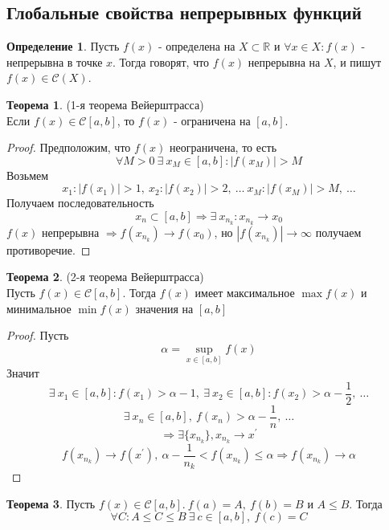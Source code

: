 \documentclass[a4paper, 12pt]{article}
\newcommand{\R}{\mathbb{R}}
\theoremstyle{definition}
\newtheorem*{definition}{Определение}
\newtheorem*{theorem}{Теорема}
\begin{document}
    \subsection{Глобальные свойства непрерывных функций}
        \begin{definition}
            Пусть $f(x)$ - определена на $X\subset \R$ и $\forall x\in X: f(x)$ - непрерывна в точке $x$. Тогда говорят, что $f(x)$ непрерывна на $X$, и пишут $f(x)\in \mathcal{C}(X)$.
        \end{definition} 
        \begin{theorem} (1-я теорема Вейерштрасса)\\
            Если $f(x)\in \mathcal{C}[a,b]$, то $f(x)$ - ограничена на $[a,b]$.
        \end{theorem} 
        \begin{proof}
            Предположим, что $f(x)$ неограничена, то есть \\
            \[\forall M>0\ \exists\ x_M\in [a,b]: |f(x_M)|>M\]
            Возьмем 
            \[x_1: |f(x_1)|>1,\ x_2: |f(x_2)|>2,\ \dots\ x_M: |f(x_M)|>M,\ \dots\]
            Получаем последовательность 
            \[x_n\subset [a,b]\Rightarrow \exists\ x_{n_k}: x_{n_k}\to x_0\]
            $f(x)$ непрерывна $\Rightarrow f(x_{n_k})\to f(x_0)$, но $|f(x_{n_k})|\to \infty$ получаем противоречие.
        \end{proof} 
        \begin{theorem} (2-я теорема Вейерштрасса)\\
            Пусть $f(x)\in \mathcal{C}[a,b]$. Тогда $f(x)$ имеет максимальное $\max{f(x)}$ и минимальное $\min{f(x)}$ значения на $[a,b]$
        \end{theorem} 
        \begin{proof}
            Пусть 
            \[\alpha = \sup\limits_{x\in [a,b]} f(x)\] 
            Значит
            \[\exists\ x_1 \in [a,b]: f(x_1)>\alpha-1,\ \exists\ x_2\in [a,b]: f(x_2)>\alpha - \frac{1}{2},\ \dots\]
            \[\exists\ x_n\in [a,b],\ f(x_n)>\alpha - \frac{1}{n},\ \dots\]
            \[\Rightarrow \exists \{x_{n_k}\}, x_{n_k}\to x^{\prime}\]
            \[f(x_{n_k})\to f(x^{\prime}),\ \alpha-\frac{1}{n_k}<f(x_{n_k})\leq \alpha \Rightarrow f(x_{n_k})\to \alpha\]
        \end{proof} 
        \begin{theorem}
            Пусть $f(x)\in \mathcal{C}[a,b].\ f(a)=A,\ f(b)=B$ и $A\leq B$. Тогда 
            \[\forall C: A\leq C\leq B\ \exists\ c\in [a,b],\ f(c)=C\]
        \end{theorem} 
\end{document}
